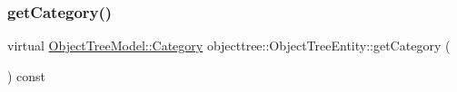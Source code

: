 \mbox{\label{classobjecttree_1_1_object_tree_entity_aa4e80e7fa80672c1b9902add665abc77}} 
\subsubsection{\texorpdfstring{getCategory()}{getCategory()}}
{\footnotesize\ttfamily virtual \mbox{\hyperlink{class_object_tree_model_a379e9d6b0d381853785adf62095ba4e3}{Object\+Tree\+Model\+::\+Category}} objecttree\+::\+Object\+Tree\+Entity\+::get\+Category (\begin{DoxyParamCaption}{ }\end{DoxyParamCaption}) const\hspace{0.3cm}{\ttfamily [pure virtual]}}



